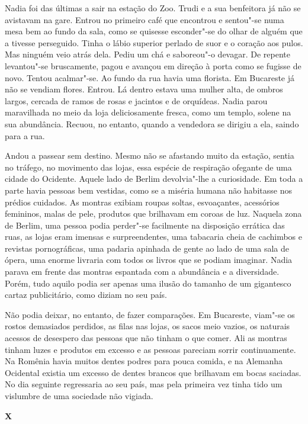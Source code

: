 Nadia foi das últimas a sair na estação do Zoo. Trudi
e a sua benfeitora já não se avistavam na gare. Entrou no primeiro café
que encontrou e sentou"-se numa mesa bem ao fundo da sala, como se
quisesse esconder"-se do olhar de alguém que a tivesse perseguido. Tinha
o lábio superior perlado de suor e o coração aos pulos. Mas ninguém veio %
atrás dela. Pediu um chá e saboreou"-o devagar. De repente levantou"-se
bruscamente, pagou e avançou em direção à porta como se fugisse de
novo. Tentou acalmar"-se. Ao fundo da rua havia uma florista. Em
Bucareste já não se vendiam flores. Entrou. Lá dentro estava uma mulher
alta, de ombros largos, cercada de ramos de rosas e jacintos e de
orquídeas. Nadia parou maravilhada no meio da loja deliciosamente
fresca, como um templo, solene na sua abundância. Recuou, no entanto,
quando a vendedora se dirigiu a ela, saindo para a rua.


Andou a passear sem destino. Mesmo não se afastando muito da estação,
sentia no tráfego, no movimento das lojas, essa espécie de respiração
ofegante de uma cidade do Ocidente. Aquele lado de Berlim devolvia"-lhe a
curiosidade. Em toda a parte havia pessoas bem vestidas, como se a
miséria humana não habitasse nos prédios cuidados. As montras exibiam
roupas soltas, esvoaçantes, acessórios femininos, malas de pele,
produtos que brilhavam em coroas de luz. Naquela zona de Berlim, uma
pessoa podia perder"-se facilmente na disposição errática das ruas, as
lojas eram imensas e surpreendentes, uma tabacaria cheia de cachimbos e
revistas pornográficas, uma padaria apinhada de gente ao lado de uma
sala de ópera, uma enorme livraria com todos os livros que se podiam
imaginar. Nadia parava em frente das montras espantada com a
abundância e a diversidade. Porém, tudo aquilo podia ser apenas uma
ilusão do tamanho de um gigantesco cartaz publicitário, como diziam no
seu país.

Não podia deixar, no entanto, de fazer comparações.
Em Bucareste, viam"-se os rostos demasiados perdidos, as filas nas lojas,
os sacos meio vazios, os naturais acessos de desespero das pessoas que
não tinham o que comer. Ali as montras tinham luzes e produtos em
excesso e as pessoas pareciam sorrir continuamente. Na Romênia havia
muitos dentes podres para pouca comida, e na Alemanha Ocidental
existia um excesso de dentes brancos que brilhavam em bocas saciadas.
No dia seguinte regressaria ao seu país, mas pela primeira vez tinha
tido um vislumbre de uma sociedade não vigiada.


\pagebreak
\movetooddpage
\vspace*{1.8cm}
\noindent{}\textbf{X}

